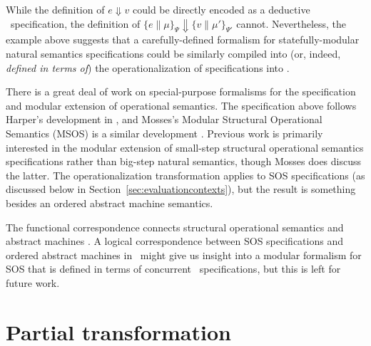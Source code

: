 While the definition of $e \Downarrow v$ could be directly encoded
as a deductive \sls~specification, the definition of
$\{ e \| \mu \}_{\Psi} \Downarrow \{ v \| \mu' \}_{\Psi'}$ cannot.
Nevertheless, the example above suggests
that a carefully-defined formalism for statefully-modular natural
semantics specifications could be similarly compiled into (or, indeed,
{\it defined in terms of}) the operationalization of specifications
into \sls.

There is a great deal of work on special-purpose formalisms for the 
specification and modular extension of operational semantics. 
The specification above follows Harper's development
in \cite{harper12practical}, and Mosses's Modular Structural
Operational Semantics (MSOS) is a similar development 
\cite{mosses04modular}. Previous work is primarily interested in the
modular extension of small-step structural operational semantics
specifications rather than big-step natural semantics, though Mosses
does discuss the latter. The operationalization transformation applies
to SOS specifications (as discussed below in
Section~\ref{sec:evaluationcontexts}), but the result is something
besides an ordered abstract machine semantics.

The functional correspondence connects structural operational
semantics and abstract machines \cite{danvy08defunctionalized}. A
logical correspondence between SOS specifications and ordered abstract
machines in \sls~might give us insight into a modular formalism for
SOS that is defined in terms of concurrent \sls~specifications, but
this is left for future work.


\section{Partial transformation}
\label{sec:othertransform}

